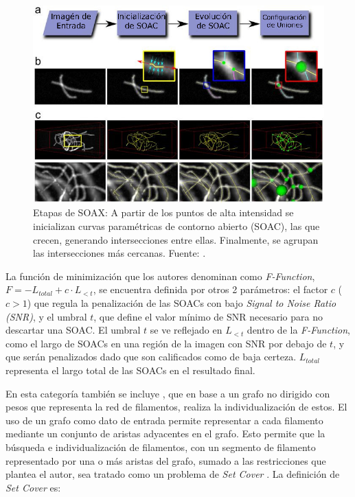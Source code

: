 \begin{figure}[h]
        \includegraphics[scale=0.7]{imagenes/SOAX_translated.jpg}
        \caption{Etapas de SOAX: A partir de los puntos de alta intensidad se inicializan curvas param\'etricas de contorno abierto (SOAC), las que crecen, generando intersecciones entre ellas. Finalmente, se agrupan las intersecciones más cercanas. Fuente: \cite{xu2015soax}.}
        \label{fig:SOAX}
\end{figure}

La funci\'on de minimizaci\'on que los autores denominan como  \textit{F-Function}, $F = -L_{total} + {c}\cdot L_{<t}$, se encuentra definida por otros 2 par\'ametros: el factor $c$ ($c > 1$) que regula la penalizaci\'on de las SOACs con bajo \textit{Signal to Noise Ratio (SNR)}, y el umbral $t$, que define el valor mínimo de SNR necesario para no descartar una SOAC. El umbral $t$ se ve reflejado en $L_{<t}$ dentro de la \textit{F-Function}, como el largo de SOACs en una regi\'on de la imagen con SNR por debajo de $t$, y que ser\'an penalizados dado que son calificados como de baja certeza. $L_{total}$ representa el largo total de las SOACs en el resultado final.



En esta categor\'ia tambi\'en se incluye \cite{breuer2015define}, que en base a un grafo no dirigido con pesos que representa la red de filamentos, realiza la individualizaci\'on de estos. El uso de un grafo como dato de entrada permite representar a cada filamento mediante un conjunto de aristas adyacentes en el grafo. Esto permite que la b\'usqueda e individualizaci\'on de filamentos, con un segmento de filamento representado por una o m\'as aristas del grafo, sumado a las restricciones que plantea el autor, sea tratado como un problema de {\it Set Cover} \cite{caprara2000algorithms}. La definici\'on de {\it Set Cover} es:

